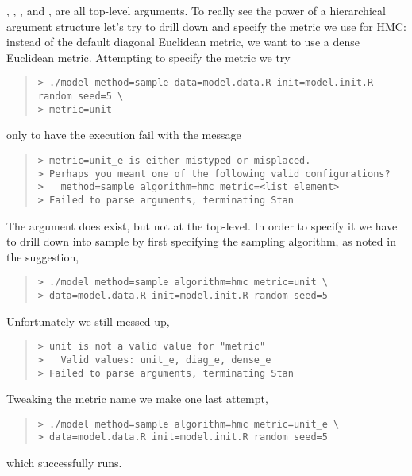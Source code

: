 , , ,  and , are all top-level
arguments.  To really see the power of a hierarchical argument structure let's
try to drill down and specify the metric we use for HMC: instead of the default
diagonal Euclidean metric, we want to use a dense Euclidean metric.  Attempting
to specify the metric we try
%
\begin{quote}
\begin{Verbatim}[fontshape=sl,fontsize=\small]
> ./model method=sample data=model.data.R init=model.init.R random seed=5 \
> metric=unit
\end{Verbatim}
\end{quote}
%
only to have the execution fail with the message
%
\begin{quote}
\begin{Verbatim}[fontshape=sl,fontsize=\small]
> metric=unit_e is either mistyped or misplaced.
> Perhaps you meant one of the following valid configurations?
>   method=sample algorithm=hmc metric=<list_element>
> Failed to parse arguments, terminating Stan
\end{Verbatim}
\end{quote}
%
The argument  does exist, but not at the top-level.  In order
to specify it we have to drill down into sample by first specifying the
sampling algorithm, as noted in the suggestion,
%
\begin{quote}
\begin{Verbatim}[fontshape=sl,fontsize=\small]
> ./model method=sample algorithm=hmc metric=unit \
> data=model.data.R init=model.init.R random seed=5
\end{Verbatim}
\end{quote}
%
Unfortunately we still messed up,
%
\begin{quote}
\begin{Verbatim}[fontshape=sl,fontsize=\small]
> unit is not a valid value for "metric"
>   Valid values: unit_e, diag_e, dense_e
> Failed to parse arguments, terminating Stan
\end{Verbatim}
\end{quote}
%
Tweaking the metric name we make one last attempt,
%
\begin{quote}
\begin{Verbatim}[fontshape=sl,fontsize=\small]
> ./model method=sample algorithm=hmc metric=unit_e \
> data=model.data.R init=model.init.R random seed=5
\end{Verbatim}
\end{quote}
%
which successfully runs.

